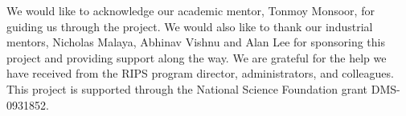 %
%
%

We would like to acknowledge our academic mentor, Tonmoy Monsoor, for guiding us through the project. We would also like to thank our industrial mentors, Nicholas Malaya, Abhinav Vishnu and Alan Lee for sponsoring this project and providing support along the way. We are grateful for the help we have received from the RIPS program director, administrators, and colleagues. This project is supported through the National Science Foundation grant DMS-0931852. 
